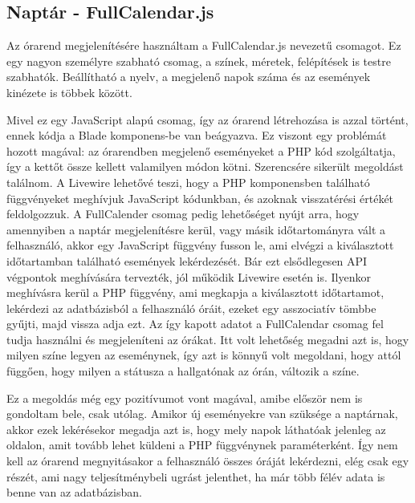 \documentclass[
]{thesis-ekf}
\theoremstyle{definition}
\theoremstyle{remark}
\begin{document}


\subsection{Naptár - FullCalendar.js}

Az órarend megjelenítésére használtam a FullCalendar.js\cite{fullcalendar} nevezetű csomagot. Ez egy nagyon személyre szabható csomag, a színek, méretek, felépítések is testre szabhatók. Beállítható a nyelv, a megjelenő napok száma és az események kinézete is többek között.

Mivel ez egy JavaScript alapú csomag, így az órarend létrehozása is azzal történt, ennek kódja a Blade komponens-be van beágyazva. Ez viszont egy problémát hozott magával: az órarendben megjelenő eseményeket a PHP kód szolgáltatja, így a kettőt össze kellett valamilyen módon kötni. Szerencsére sikerült megoldást találnom. A Livewire lehetővé teszi, hogy a PHP komponensben található függvényeket meghívjuk JavaScript kódunkban, és azoknak visszatérési értékét feldolgozzuk. A FullCalender csomag pedig lehetőséget nyújt arra, hogy amennyiben a naptár megjelenítésre kerül, vagy másik időtartományra vált a felhasználó, akkor egy JavaScript függvény fusson le, ami elvégzi a kiválasztott időtartamban található események lekérdezését. Bár ezt elsődlegesen API végpontok meghívására tervezték, jól működik Livewire esetén is. Ilyenkor meghívásra kerül a PHP függvény, ami megkapja a kiválasztott időtartamot, lekérdezi az adatbázisból a felhasználó óráit, ezeket egy asszociatív tömbbe gyűjti, majd vissza adja ezt. Az így kapott adatot a FullCalendar csomag fel tudja használni és megjeleníteni az órákat. Itt volt lehetőség megadni azt is, hogy milyen színe legyen az eseménynek, így azt is könnyű volt megoldani, hogy attól függően, hogy milyen a státusza a hallgatónak az órán, változik a színe.

Ez a megoldás még egy pozitívumot vont magával, amibe először nem is gondoltam bele, csak utólag. Amikor új eseményekre van szüksége a naptárnak, akkor ezek lekérésekor megadja azt is, hogy mely napok láthatóak jelenleg az oldalon, amit tovább lehet küldeni a PHP függvénynek paraméterként. Így nem kell az órarend megnyitásakor a felhasználó összes óráját lekérdezni, elég csak egy részét, ami nagy teljesítménybeli ugrást jelenthet, ha már több félév adata is benne van az adatbázisban.
\end{document}
